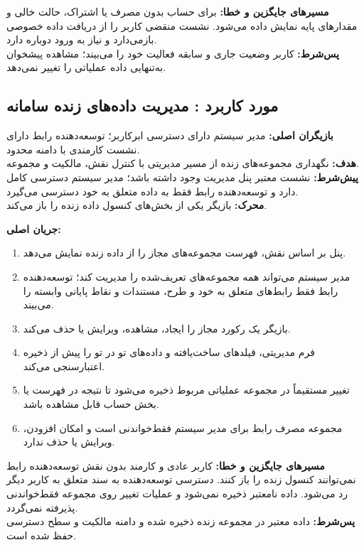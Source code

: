 \noindent\textbf{مسیرهای جایگزین و خطا:}
برای حساب بدون مصرف یا اشتراک، حالت خالی و مقدارهای پایه نمایش داده می‌شود. نشست منقضی کاربر را از دریافت داده خصوصی بازمی‌دارد و نیاز به ورود دوباره دارد.\\
\textbf{پس‌شرط:} کاربر وضعیت جاری و سابقه فعالیت خود را می‌بیند؛ مشاهده پیشخوان به‌تنهایی داده عملیاتی را تغییر نمی‌دهد.

\UseCaseStart
\subsection{مورد کاربرد : مدیریت داده‌های زنده سامانه}
\noindent\textbf{بازیگران اصلی:} مدیر سیستم دارای دسترسی ابرکاربر؛ توسعه‌دهنده رابط دارای نشست کارمندی با دامنه محدود.\\
\textbf{هدف:} نگهداری مجموعه‌های زنده  از مسیر مدیریتی با کنترل نقش، مالکیت و مجموعه.\\
\textbf{پیش‌شرط:} نشست معتبر پنل مدیریت وجود داشته باشد؛ مدیر سیستم دسترسی کامل دارد و توسعه‌دهنده رابط فقط به داده متعلق به خود دسترسی می‌گیرد.\\
\textbf{محرک:} بازیگر یکی از بخش‌های کنسول داده زنده را باز می‌کند.


\noindent\textbf{جریان اصلی:}
\begin{enumerate}
  \item پنل بر اساس نقش، فهرست مجموعه‌های مجاز را از داده زنده  نمایش می‌دهد.
  \item مدیر سیستم می‌تواند همه مجموعه‌های تعریف‌شده را مدیریت کند؛ توسعه‌دهنده رابط فقط رابط‌های متعلق به خود و طرح، مستندات و نقاط پایانی وابسته را می‌بیند.
  \item بازیگر یک رکورد مجاز را ایجاد، مشاهده، ویرایش یا حذف می‌کند.
  \item فرم مدیریتی، فیلدهای ساخت‌یافته و داده‌های تو در تو را پیش از ذخیره اعتبارسنجی می‌کند.
  \item تغییر مستقیماً در مجموعه عملیاتی مربوط ذخیره می‌شود تا نتیجه در فهرست یا بخش حساب قابل مشاهده باشد.
  \item مجموعه مصرف رابط برای مدیر سیستم فقط‌خواندنی است و امکان افزودن، ویرایش یا حذف ندارد.
\end{enumerate}

\noindent\textbf{مسیرهای جایگزین و خطا:}
کاربر عادی و کارمند بدون نقش توسعه‌دهنده رابط نمی‌توانند کنسول زنده را باز کنند. دسترسی توسعه‌دهنده به سند متعلق به کاربر دیگر رد می‌شود. داده نامعتبر ذخیره نمی‌شود و عملیات تغییر روی مجموعه فقط‌خواندنی پذیرفته نمی‌گردد.\\
\textbf{پس‌شرط:} داده معتبر در مجموعه زنده ذخیره شده و دامنه مالکیت و سطح دسترسی حفظ شده است.

